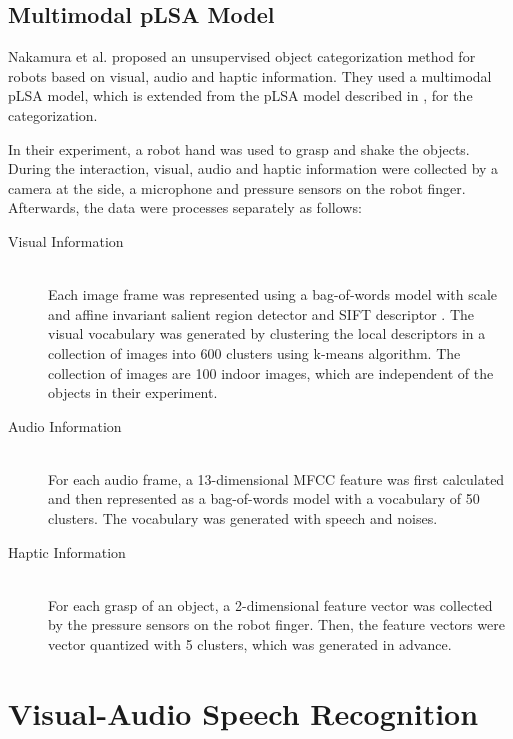 \subsection{Multimodal pLSA Model}
Nakamura et al. \cite{nakamura_multimodal_2007} proposed an unsupervised object categorization method for robots based on visual, audio and haptic information. They used a multimodal pLSA model, which is extended from the pLSA model described in \cite{sivic_discovering_2005}, for the categorization.

In their experiment, a robot hand was used to grasp and shake the objects. During the interaction, visual, audio and haptic information were collected by a camera at the side, a microphone and pressure sensors on the robot finger. Afterwards, the data were processes separately as follows:
\begin{description}
  \item[Visual Information] \hfill \\
    Each image frame was represented using a bag-of-words model with scale and affine invariant salient region detector \cite{mikolajczyk_scale_2004} and SIFT descriptor \cite{lowe_distinctive_2004}. The visual vocabulary was generated by clustering the local descriptors in a collection of images into 600 clusters using k-means algorithm. The collection of images are 100 indoor images, which are independent of the objects in their experiment.
  \item[Audio Information] \hfill \\
    For each audio frame, a 13-dimensional MFCC feature was first calculated and then represented as a bag-of-words model with a vocabulary of 50 clusters. The vocabulary was generated with speech and noises.
  \item[Haptic Information] \hfill \\
    For each grasp of an object, a 2-dimensional feature vector was collected by the pressure sensors on the robot finger. Then, the feature vectors were vector quantized with 5 clusters, which was generated in advance.
\end{description}




\section{Visual-Audio Speech Recognition}

